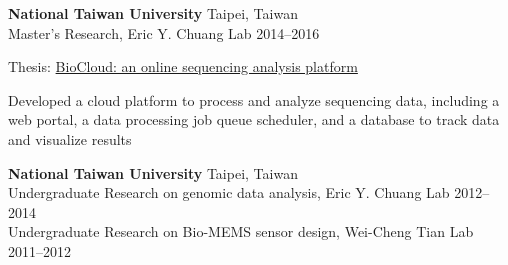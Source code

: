 \begin{entrylist}
\item \textbf{National Taiwan University} \hfill Taipei, Taiwan\\
Master's Research, Eric Y. Chuang Lab \hfill
2014--2016
\begin{detaillist}
    \item Thesis: \href{https://doi.org/10.6342/NTU201601295}{BioCloud: an online sequencing analysis platform}
    \item Developed a cloud platform to process and analyze sequencing data, including a web portal, a data processing job queue scheduler, and a database to track data and visualize results
\end{detaillist}

\item \textbf{National Taiwan University} \hfill Taipei, Taiwan\\
Undergraduate Research on genomic data analysis, Eric Y. Chuang Lab \hfill
2012--2014\\
Undergraduate Research on Bio-MEMS sensor design, Wei-Cheng Tian Lab \hfill
2011--2012

\end{entrylist}
